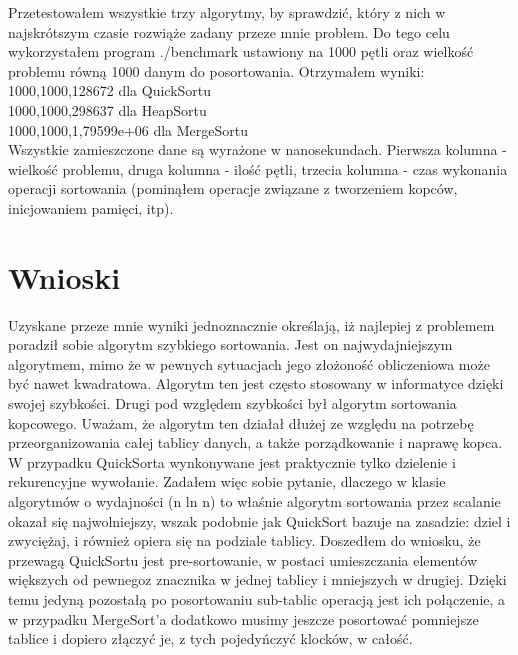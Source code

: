 \documentclass[a4paper,12pt]{article}
\begin{document}
Przetestowałem wszystkie trzy algorytmy, by sprawdzić, który z nich w najskrótszym czasie rozwiąże zadany przeze mnie problem. Do tego celu wykorzystałem program
./benchmark ustawiony na 1000 pętli oraz wielkość problemu równą 1000 danym do posortowania. Otrzymałem wyniki:\\

{\raggedleft{}1000,1000,128672 dla QuickSortu} \\
1000,1000,298637 dla HeapSortu \\
1000,1000,1,79599e+06 dla MergeSortu \\


Wszystkie zamieszczone dane są wyrażone w nanosekundach. Pierwsza kolumna - wielkość problemu, druga kolumna - ilość pętli, trzecia kolumna - czas wykonania operacji
sortowania (pominąłem operacje związane z tworzeniem kopców, inicjowaniem pamięci, itp).

\section{Wnioski}
Uzyskane przeze mnie wyniki jednoznacznie określają, iż najlepiej z problemem poradził sobie algorytm szybkiego sortowania. Jest on najwydajniejszym algorytmem, mimo
że w pewnych sytuacjach jego złożoność obliczeniowa może być nawet kwadratowa. Algorytm ten jest często stosowany w informatyce dzięki swojej szybkości. Drugi pod
względem szybkości był algorytm sortowania kopcowego. Uważam, że algorytm ten działał dłużej ze względu na potrzebę przeorganizowania całej tablicy danych, a także
porządkowanie i naprawę kopca. W przypadku QuickSorta wynkonywane jest praktycznie tylko dzielenie i rekurencyjne wywołanie. Zadałem więc sobie pytanie, dlaczego
w klasie algorytmów o wydajności (n ln n) to właśnie algorytm sortowania przez scalanie okazał się najwolniejszy, wszak podobnie jak QuickSort bazuje na zasadzie:
dziel i zwyciężaj, i również opiera się na podziale tablicy. Doszedłem do wniosku, że przewagą QuickSortu jest pre-sortowanie, w postaci umieszczania elementów
większych od pewnegoz znacznika w jednej tablicy i mniejszych w drugiej. Dzięki temu jedyną pozostałą po posortowaniu sub-tablic operacją jest ich połączenie, a w
przypadku MergeSort'a dodatkowo musimy jeszcze posortować pomniejsze tablice i dopiero złączyć je, z tych pojedyńczyć klocków, w całość.
\end{document}
